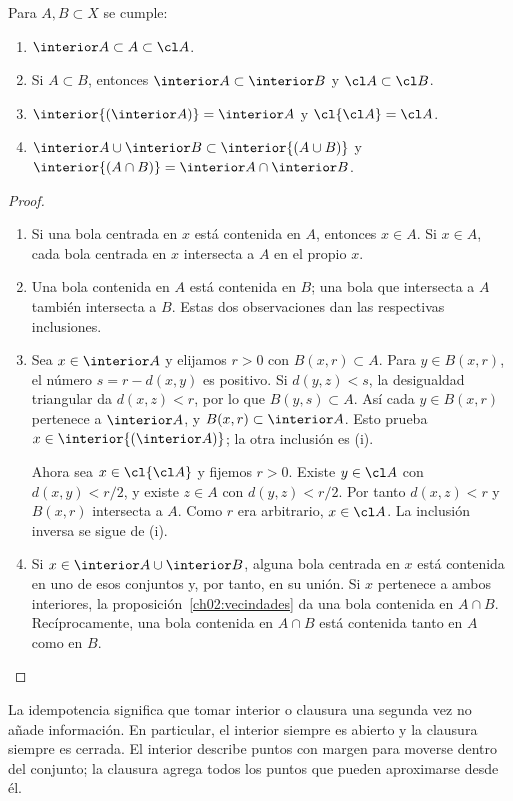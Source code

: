 \begin{proposicion}\label{ch02:operaciones}
Para $A,B\subset X$ se cumple:
\begin{enumerate}[label=(\roman*)]
\item $\interior A\subset A\subset\cl A$.
\item Si $A\subset B$, entonces $\interior A\subset\interior B$ y $\cl A\subset\cl B$.
\item $\interior{(\interior A)}=\interior A$ y $\cl{\cl A}=\cl A$.
\item $\interior A\cup\interior B\subset\interior{(A\cup B)}$ y $\interior{(A\cap B)}=\interior A\cap\interior B$.
\end{enumerate}
\end{proposicion}
\begin{proof}
\begin{enumerate}[label=(\roman*)]
\item Si una bola centrada en $x$ está contenida en $A$, entonces $x\in A$. Si $x\in A$, cada bola centrada en $x$ intersecta a $A$ en el propio $x$.
\item Una bola contenida en $A$ está contenida en $B$; una bola que intersecta a $A$ también intersecta a $B$. Estas dos observaciones dan las respectivas inclusiones.
\item Sea $x\in\interior A$ y elijamos $r>0$ con $B(x,r)\subset A$. Para $y\in B(x,r)$, el número $s=r-d(x,y)$ es positivo. Si $d(y,z)<s$, la desigualdad triangular da $d(x,z)<r$, por lo que $B(y,s)\subset A$. Así cada $y\in B(x,r)$ pertenece a $\interior A$, y $B(x,r)\subset\interior A$. Esto prueba $x\in\interior{(\interior A)}$; la otra inclusión es (i).

Ahora sea $x\in\cl{\cl A}$ y fijemos $r>0$. Existe $y\in\cl A$ con $d(x,y)<r/2$, y existe $z\in A$ con $d(y,z)<r/2$. Por tanto $d(x,z)<r$ y $B(x,r)$ intersecta a $A$. Como $r$ era arbitrario, $x\in\cl A$. La inclusión inversa se sigue de (i).
\item Si $x\in\interior A\cup\interior B$, alguna bola centrada en $x$ está contenida en uno de esos conjuntos y, por tanto, en su unión. Si $x$ pertenece a ambos interiores, la proposición~\ref{ch02:vecindades} da una bola contenida en $A\cap B$. Recíprocamente, una bola contenida en $A\cap B$ está contenida tanto en $A$ como en $B$.
\end{enumerate}
\end{proof}
La idempotencia significa que tomar interior o clausura una segunda vez no añade información. En particular, el interior siempre es abierto y la clausura siempre es cerrada. El interior describe puntos con margen para moverse dentro del conjunto; la clausura agrega todos los puntos que pueden aproximarse desde él.

